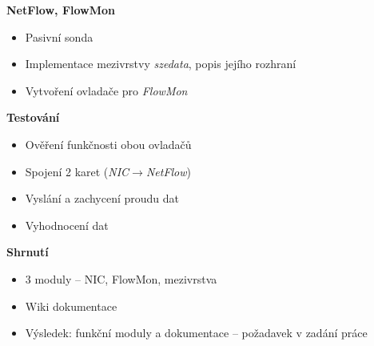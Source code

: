 \documentclass[a5paper,landscape]{slides}
\newcommand{\nflow}{\emph{NetFlow}}
\newcommand{\nic}{\emph{NIC}}
\begin{document}
\begin{slide}
\begin{center}\textbf{NetFlow, FlowMon}\end{center}
\begin{itemize}
\addtolength{\itemsep}{-1em}
\item Pasivní sonda
\item Implementace mezivrstvy \emph{szedata}, popis jejího rozhraní
\item Vytvoření ovladače pro \emph{FlowMon}
\end{itemize}
\end{slide}

\begin{slide}
\begin{center}\textbf{Testování}\end{center}
\begin{itemize}
\addtolength{\itemsep}{-1em}
\item Ověření funkčnosti obou ovladačů
\item Spojení 2 karet (\nic$\rightarrow$\nflow)
\item Vyslání a zachycení proudu dat
\item Vyhodnocení dat
\end{itemize}
\end{slide}

\begin{slide}
\begin{center}\textbf{Shrnutí}\end{center}
\begin{itemize}
\addtolength{\itemsep}{-1em}
\item 3 moduly -- NIC, FlowMon, mezivrstva
\item Wiki dokumentace
\item Výsledek: funkční moduly a dokumentace -- požadavek v zadání práce
\end{itemize}
\end{slide}
\end{document}
